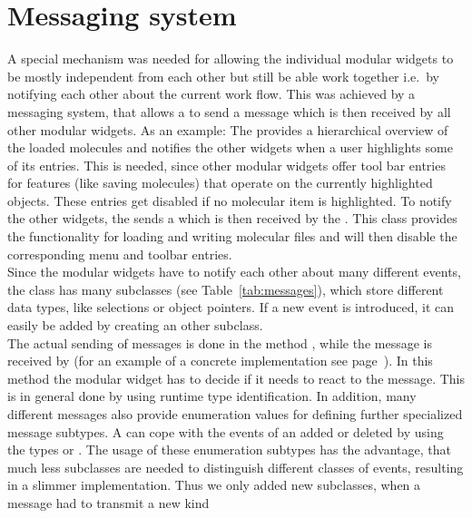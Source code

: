 \section{Messaging system} \label{message}
A special mechanism was needed for allowing the individual modular widgets to be mostly 
independent from each other but still be able work together i.e.\ by notifying each other 
about the current work flow. 
This was achieved by a messaging system, that allows a  to send a 
message which is then received by all other modular widgets.
As an example: 
The  provides a hierarchical overview of the loaded molecules
and notifies the other widgets when a user highlights some of its entries. 
This is needed, since other modular widgets offer tool bar entries for features (like 
saving molecules) that operate on the currently highlighted objects. 
These entries get disabled if no molecular item is highlighted.
To notify the other widgets, the  sends a 
which is then received by the .
This class provides the functionality for loading and writing molecular files and will 
then disable the corresponding menu and toolbar entries.\\
Since the modular widgets have to notify each other about many different events, the class
 has many subclasses (see Table~\ref{tab:messages}), which store different data
types, like selections or object pointers. 
If a new event is introduced, it can easily be added by creating an other  
subclass.
\\
The actual sending of messages is done in the method , while 
the message is received by  (for an example of a concrete
implementation see page~\pageref{onNotify}).
In this method the modular widget has to decide if it needs to react to the message. 
This is in general done by using runtime type identification. 
In addition, many different messages also provide enumeration values for defining further
specialized message subtypes. 
A  can \eg cope with the events of an added or deleted 
 by using the types  or 
.
The usage of these enumeration subtypes has the advantage, that much less subclasses
are needed to distinguish different classes of events, resulting in a slimmer implementation.
Thus we only added new  subclasses, when a message had to transmit a new kind 
